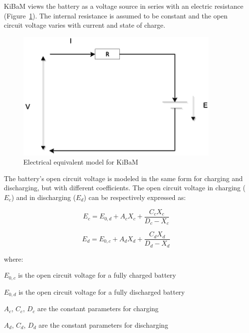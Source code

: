 KiBaM views the battery as a voltage source in series with an electric resistance (Figure~\ref{fig:electrical-equivalent-model-for-kibam}). The internal resistance is assumed to be constant and the open circuit voltage varies with current and state of charge.

\begin{figure}[hbtp] %
\centering
\includegraphics[width=0.9\textwidth, height=0.9\textheight, keepaspectratio=true]{media/image7528.svg.png}
\caption{Electrical equivalent model for KiBaM \protect \label{fig:electrical-equivalent-model-for-kibam}}
\end{figure}

The battery's open circuit voltage is modeled in the same form for charging and discharging, but with different coefficients. The open circuit voltage in charging (\({E_c}\)) and in discharging (\({E_d}\)) can be respectively expressed as:

\begin{equation}
{E_c} = {E_{0,d}} + {A_c}{X_c} + \frac{{{C_c}{X_c}}}{{{D_c} - {X_c}}}
\end{equation}

\begin{equation}
{E_d} = {E_{0,c}} + {A_d}{X_d} + \frac{{{C_d}{X_d}}}{{{D_d} - {X_d}}}
\end{equation}

where:

\({E_{0,c}}\) is the open circuit voltage for a fully charged battery

\({E_{0,d}}\) is the open circuit voltage for a fully discharged battery

\({A_c}\), \({C_c}\), \({D_c}\) are the constant parameters for charging

\({A_d}\), \({C_d}\), \({D_d}\) are the constant parameters for discharging

